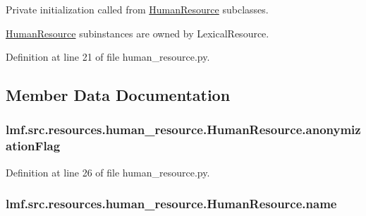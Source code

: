 Private initialization called from \hyperlink{classlmf_1_1src_1_1resources_1_1human__resource_1_1_human_resource}{Human\+Resource} subclasses. 

\hyperlink{classlmf_1_1src_1_1resources_1_1human__resource_1_1_human_resource}{Human\+Resource} subinstances are owned by Lexical\+Resource. 

Definition at line 21 of file human\+\_\+resource.\+py.



\subsection{Member Data Documentation}
\hypertarget{classlmf_1_1src_1_1resources_1_1human__resource_1_1_human_resource_af75d8c40ab421aea011a028c9ccda753}{
\subsubsection[{anonymization\+Flag}]{\setlength{\rightskip}{0pt plus 5cm}lmf.\+src.\+resources.\+human\+\_\+resource.\+Human\+Resource.\+anonymization\+Flag}}\label{classlmf_1_1src_1_1resources_1_1human__resource_1_1_human_resource_af75d8c40ab421aea011a028c9ccda753}


Definition at line 26 of file human\+\_\+resource.\+py.

\hypertarget{classlmf_1_1src_1_1resources_1_1human__resource_1_1_human_resource_a12fcc645b94757742d4ea5c3db0393f0}{
\subsubsection[{name}]{\setlength{\rightskip}{0pt plus 5cm}lmf.\+src.\+resources.\+human\+\_\+resource.\+Human\+Resource.\+name}}\label{classlmf_1_1src_1_1resources_1_1human__resource_1_1_human_resource_a12fcc645b94757742d4ea5c3db0393f0}


